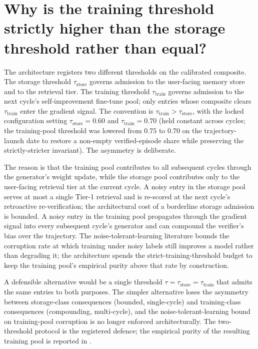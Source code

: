\section[Training vs storage threshold]{Why is the training threshold strictly higher than the storage threshold rather than equal?}
\label{app:qa-tau-train-vs-store}

The architecture registers two different thresholds on the calibrated composite. The storage threshold $\tau_{\text{store}}$ governs admission to the user-facing memory store and to the retrieval tier. The training threshold $\tau_{\text{train}}$ governs admission to the next cycle's self-improvement fine-tune pool; only entries whose composite clears $\tau_{\text{train}}$ enter the gradient signal. The convention is $\tau_{\text{train}} > \tau_{\text{store}}$, with the locked configuration setting $\tau_{\text{store}} = 0.60$ and $\tau_{\text{train}} = 0.70$ (held constant across cycles; the training-pool threshold was lowered from $0.75$ to $0.70$ on the trajectory-launch date to restore a non-empty verified-episode share while preserving the strictly-stricter invariant). The asymmetry is deliberate.

The reason is that the training pool contributes to all subsequent cycles through the generator's weight update, while the storage pool contributes only to the user-facing retrieval tier at the current cycle. A noisy entry in the storage pool serves at most a single Tier-1 retrieval and is re-scored at the next cycle's retroactive re-verification; the architectural cost of a borderline storage admission is bounded. A noisy entry in the training pool propagates through the gradient signal into every subsequent cycle's generator and can compound the verifier's bias over the trajectory. The noise-tolerant-learning literature \cite{natarajan2013learning} bounds the corruption rate at which training under noisy labels still improves a model rather than degrading it; the architecture spends the strict-training-threshold budget to keep the training pool's empirical purity above that rate by construction.

A defensible alternative would be a single threshold $\tau = \tau_{\text{store}} = \tau_{\text{train}}$ that admits the same entries to both purposes. The simpler alternative loses the asymmetry between storage-class consequences (bounded, single-cycle) and training-class consequences (compounding, multi-cycle), and the noise-tolerant-learning bound on training-pool corruption is no longer enforced architecturally. The two-threshold protocol is the registered defence; the empirical purity of the resulting training pool is reported in .

